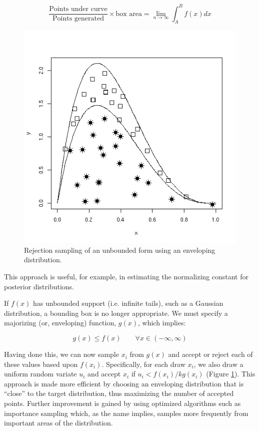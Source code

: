 \[
\frac{\mbox{Points under curve}}{\mbox{Points generated}} \times \mbox{box area} = \lim_{n \to \infty} \int_A^B f(x) dx
\]

\begin{figure}[h]
        \begin{center}
        \includegraphics[scale=0.4]{envelope.png}
    \end{center}
    \caption{Rejection sampling of an unbounded form using an enveloping distribution.}
    \label{fig:unbound}
\end{figure}

\noindent This approach is useful, for example, in estimating the normalizing constant for posterior distributions.

If $f(x)$ has unbounded support (i.e. infinite tails), such as a Gaussian distribution, a bounding box is no longer appropriate. We must specify a majorizing (or, enveloping) function, $g(x)$, which implies:

\[
g(x) \le  f(x) \qquad\forall x \in (-\infty,\infty)
\]

Having done this, we can now sample ${x_i}$ from $g(x)$ and accept or reject each of these values based upon $f(x_i)$. Specifically, for each draw $x_i$, we also draw a uniform random variate $u_i$ and accept $x_i$ if $u_i < f(x_i)/kg(x_i)$ (Figure \ref{fig:unbound}). This approach is made more efficient by choosing an enveloping distribution that is ``close'' to the target distribution, thus maximizing the number of accepted points. Further improvement is gained by using optimized algorithms such as importance sampling which, as the name implies, samples more frequently from important areas of the distribution.

